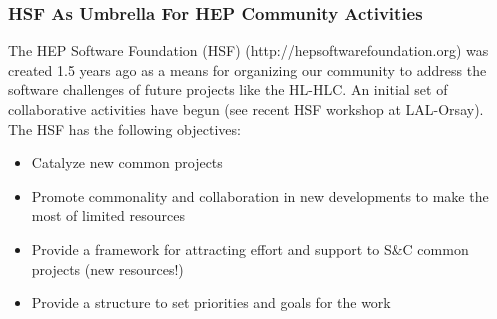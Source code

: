 \begin{frame}
 \frametitle{HSF As Umbrella For HEP Community Activities}
The HEP Software Foundation (HSF) (http://hepsoftwarefoundation.org) was created 1.5 years ago as a means for organizing our community to address the software challenges of future projects like the HL-HLC.
An initial set of collaborative activities have begun (see recent HSF workshop 
at LAL-Orsay). The HSF has the following objectives:

\begin{itemize}
\item Catalyze new common projects
\item Promote commonality and collaboration in new developments to make the most of limited resources
\item Provide a framework for attracting effort and support to S\&C common projects (new resources!)
\item Provide a structure to set priorities and goals for the work
\end{itemize}


\end{frame}


